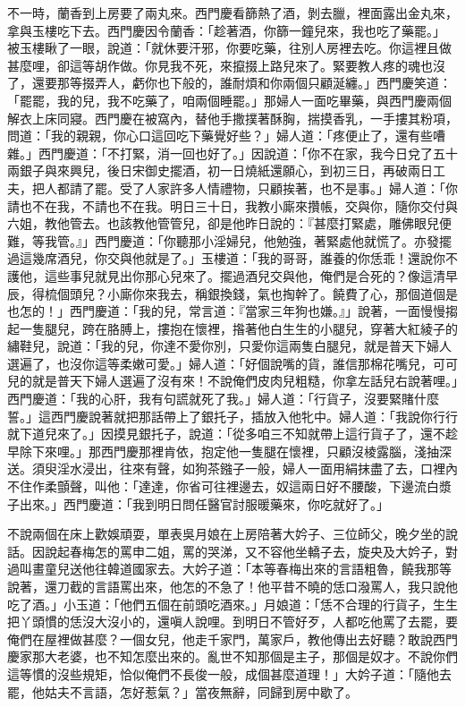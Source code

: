 不一時，蘭香到上房要了兩丸來。西門慶看篩熱了酒，剝去臘，裡面露出金丸來，拿與玉樓吃下去。西門慶因令蘭香：「趁著酒，你篩一鐘兒來，我也吃了藥罷。」 被玉樓瞅了一眼，說道：「就休要汗邪，你要吃藥，往別人房裡去吃。你這裡且做甚麼哩，卻這等胡作做。你見我不死，來攛掇上路兒來了。緊要教人疼的魂也沒了，還要那等掇弄人，虧你也下般的，誰耐煩和你兩個只顧涎纏。」西門慶笑道：「罷罷，我的兒，我不吃藥了，咱兩個睡罷。」那婦人一面吃畢藥，與西門慶兩個解衣上床同寢。西門慶在被窩內，替他手撒撲著酥胸，揣摸香乳，一手摟其粉項，問道：「我的親親，你心口這回吃下藥覺好些？」婦人道：「疼便止了，還有些嘈雜。」西門慶道：「不打緊，消一回也好了。」因說道：「你不在家，我今日兌了五十兩銀子與來興兒，後日宋御史擺酒，初一日燒紙還願心，到初三日，再破兩日工夫，把人都請了罷。受了人家許多人情禮物，只顧挨著，也不是事。」婦人道：「你請也不在我，不請也不在我。明日三十日，我教小廝來攢帳，交與你，隨你交付與六姐，教他管去。也該教他管管兒，卻是他昨日說的：『甚麼打緊處，雕佛眼兒便難，等我管。』」西門慶道：「你聽那小淫婦兒，他勉強，著緊處他就慌了。亦發擺過這幾席酒兒，你交與他就是了。」玉樓道：「我的哥哥，誰養的你恁乖！還說你不護他，這些事兒就見出你那心兒來了。擺過酒兒交與他，俺們是合死的？像這清早辰，得梳個頭兒？小廝你來我去，稱銀換錢，氣也掏幹了。饒費了心，那個道個是也怎的！」西門慶道：「我的兒，常言道：『當家三年狗也嫌。』」說著，一面慢慢搊起一隻腿兒，跨在胳膊上，摟抱在懷裡，揝著他白生生的小腿兒，穿著大紅綾子的繡鞋兒，說道：「我的兒，你達不愛你別，只愛你這兩隻白腿兒，就是普天下婦人選遍了，也沒你這等柔嫩可愛。」婦人道：「好個說嘴的貨，誰信那棉花嘴兒，可可兒的就是普天下婦人選遍了沒有來！不說俺們皮肉兒粗糙，你拿左話兒右說著哩。」西門慶道：「我的心肝，我有句謊就死了我。」婦人道：「行貨子，沒要緊賭什麼誓。」這西門慶說著就把那話帶上了銀托子，插放入他牝中。婦人道：「我說你行行就下道兒來了。」因摸見銀托子，說道：「從多咱三不知就帶上這行貨子了，還不趁早除下來哩。」那西門慶那裡肯依，抱定他一隻腿在懷裡，只顧沒棱露腦，淺抽深送。須臾淫水浸出，往來有聲，如狗茶鏹子一般，婦人一面用絹抹盡了去，口裡內不住作柔顫聲，叫他：「達達，你省可往裡邊去，奴這兩日好不腰酸，下邊流白漿子出來。」西門慶道：「我到明日問任醫官討服暖藥來，你吃就好了。」

不說兩個在床上歡娛頑耍，單表吳月娘在上房陪著大妗子、三位師父，晚夕坐的說話。因說起春梅怎的罵申二姐，罵的哭涕，又不容他坐轎子去，旋央及大妗子，對過叫畫童兒送他往韓道國家去。大妗子道：「本等春梅出來的言語粗魯，饒我那等說著，還刀截的言語罵出來，他怎的不急了！他平昔不曉的恁口潑罵人，我只說他吃了酒。」小玉道：「他們五個在前頭吃酒來。」月娘道：「恁不合理的行貨子，生生把丫頭慣的恁沒大沒小的，還嗔人說哩。到明日不管好歹，人都吃他罵了去罷，要俺們在屋裡做甚麼？一個女兒，他走千家門，萬家戶，教他傳出去好聽？敢說西門慶家那大老婆，也不知怎麼出來的。亂世不知那個是主子，那個是奴才。不說你們這等慣的沒些規矩，恰似俺們不長俊一般，成個甚麼道理！」大妗子道：「隨他去罷，他姑夫不言語，怎好惹氣？」當夜無辭，同歸到房中歇了。

